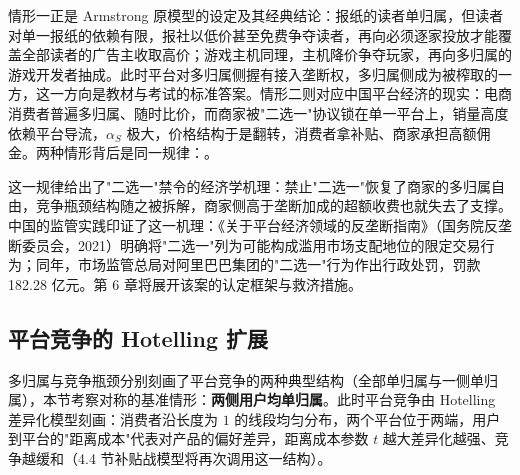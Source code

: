 情形一正是 Armstrong 原模型的设定及其经典结论：报纸的读者单归属，但读者对单一报纸的依赖有限，报社以低价甚至免费争夺读者，再向必须逐家投放才能覆盖全部读者的广告主收取高价；游戏主机同理，主机降价争夺玩家，再向多归属的游戏开发者抽成。此时平台对多归属侧握有接入垄断权，多归属侧成为被榨取的一方，这一方向是教材与考试的标准答案。情形二则对应中国平台经济的现实：电商消费者普遍多归属、随时比价，而商家被"二选一"协议锁在单一平台上，销量高度依赖平台导流，$\alpha_S$ 极大，价格结构于是翻转，消费者拿补贴、商家承担高额佣金。两种情形背后是同一规律：。

这一规律给出了"二选一"禁令的经济学机理：禁止"二选一"恢复了商家的多归属自由，竞争瓶颈结构随之被拆解，商家侧高于垄断加成的超额收费也就失去了支撑。中国的监管实践印证了这一机理：《关于平台经济领域的反垄断指南》（国务院反垄断委员会，2021）明确将"二选一"列为可能构成滥用市场支配地位的限定交易行为；同年，市场监管总局对阿里巴巴集团的"二选一"行为作出行政处罚，罚款 182.28 亿元。第 6 章将展开该案的认定框架与救济措施。

\subsection{平台竞争的 Hotelling 扩展}

多归属与竞争瓶颈分别刻画了平台竞争的两种典型结构（全部单归属与一侧单归属），本节考察对称的基准情形：\textbf{两侧用户均单归属}。此时平台竞争由 Hotelling 差异化模型刻画：消费者沿长度为 $1$ 的线段均匀分布，两个平台位于两端，用户到平台的"距离成本"代表对产品的偏好差异，距离成本参数 $t$ 越大差异化越强、竞争越缓和（4.4 节补贴战模型将再次调用这一结构）。

